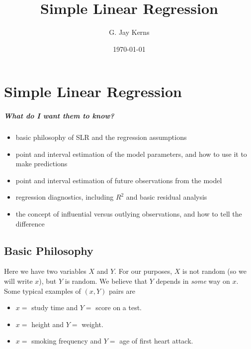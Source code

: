 \documentclass[captions=tableheading]{scrbook}
\title{Simple Linear Regression}
\author{G. Jay Kerns}
\date{\today}
\begin{document}
\maketitle


\chapter{Simple Linear Regression}
\label{sec-1}

\label{cha:simple-linear-regression}


\paragraph*{What do I want them to know?}

\begin{itemize}
\item basic philosophy of SLR and the regression assumptions
\item point and interval estimation of the model parameters, and how to use it to make predictions
\item point and interval estimation of future observations from the model
\item regression diagnostics, including \( R^{2} \) and basic residual analysis
\item the concept of influential versus outlying observations, and how to tell the difference
\end{itemize}
\section{Basic Philosophy}
\label{sec-1-1}

\label{sec:Basic-Philosophy}

Here we have two variables \(X\) and \(Y\). For our purposes, \(X\) is not random (so we will write \(x\)), but \(Y\) is random. We believe that \(Y\) depends in \emph{some} way on \(x\). Some typical examples of \( (x,Y) \) pairs are

\begin{itemize}
\item \( x = \) study time and \( Y = \) score on a test.
\item \( x = \) height and \( Y = \) weight.
\item \( x = \) smoking frequency and \( Y = \) age of first heart attack.
\end{itemize}
\end{document}
